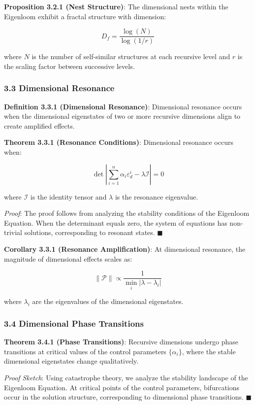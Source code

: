 \documentclass[
]{article}
\begin{document}
\textbf{Proposition 3.2.1 (Nest Structure)}: The dimensional nests
within the Eigenloom exhibit a fractal structure with dimension:

\[D_f = \frac{\log(N)}{\log(1/r)}\]

where \(N\) is the number of self-similar structures at each recursive
level and \(r\) is the scaling factor between successive levels.

\subsubsection{3.3 Dimensional Resonance}\label{dimensional-resonance}

\textbf{Definition 3.3.1 (Dimensional Resonance)}: Dimensional resonance
occurs when the dimensional eigenstates of two or more recursive
dimensions align to create amplified effects.

\textbf{Theorem 3.3.1 (Resonance Conditions)}: Dimensional resonance
occurs when:

\[\det\left|\sum_{i=1}^{n} \alpha_i \varepsilon_d^i - \lambda \mathcal{I}\right| = 0\]

where \(\mathcal{I}\) is the identity tensor and \(\lambda\) is the
resonance eigenvalue.

\emph{Proof}: The proof follows from analyzing the stability conditions
of the Eigenloom Equation. When the determinant equals zero, the system
of equations has non-trivial solutions, corresponding to resonant
states. \(\blacksquare \)

\textbf{Corollary 3.3.1 (Resonance Amplification)}: At dimensional
resonance, the magnitude of dimensional effects scales as:

\[\|\mathcal{P}\| \propto \frac{1}{\min_i |\lambda - \lambda_i|}\]

where \(\lambda_i\) are the eigenvalues of the dimensional eigenstates.

\subsubsection{3.4 Dimensional Phase
Transitions}\label{dimensional-phase-transitions}

\textbf{Theorem 3.4.1 (Phase Transitions)}: Recursive dimensions undergo
phase transitions at critical values of the control parameters
\(\{\alpha_i\}\), where the stable dimensional eigenstates change
qualitatively.

\emph{Proof Sketch}: Using catastrophe theory, we analyze the stability
landscape of the Eigenloom Equation. At critical points of the control
parameters, bifurcations occur in the solution structure, corresponding
to dimensional phase transitions. \(\blacksquare \)
\end{document}
